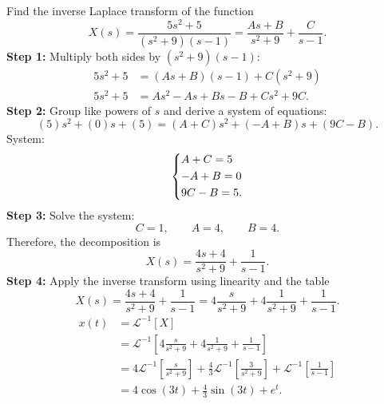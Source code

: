 \documentclass[10pt,letterpaper]{article}
\begin{document}
\begin{example}[5]{    
Find the inverse Laplace transform of the function
$$
X(s)=\frac{5s^2+5}{(s^2+9)(s-1)} =\frac{As+B}{s^2+9} + \frac{C}{s-1}.
$$
}
\textbf{Step 1:} Multiply both sides by $(s^2+9)(s-1)$:
\begin{align*}
5s^2+5&=(As+B)(s-1)+C(s^2+9)\\
5s^2+5&=As^2-As+Bs-B + Cs^2+9C.
\end{align*}
\textbf{Step 2:} Group like powers of $s$ and derive a system of equations:
\[
(5)s^2+(0)s+(5) = (A+C)s^2 +(-A+B)s +(9C-B).
\]
System:
$$
\begin{dcases}
A+C=5\\
-A+B=0\\
9C-B=5.
\end{dcases}
$$
\textbf{Step 3:} Solve the system:
\[
C=1, \qquad A=4, \qquad B=4.
\]
Therefore, the decomposition is
\[
X(s)=
\frac{4s+4}{s^2+9}
+\frac{1}{s-1}.
\]
\textbf{Step 4:} Apply the inverse transform using linearity and the table
\[
X(s)=
\frac{4s+4}{s^2+9}
+\frac{1}{s-1}=
4\frac{s}{s^2+9}
+
4\frac{1}{s^2+9}
+
\frac{1}{s-1}.
\]
\begin{align*}
x(t)&=\mathcal{L}^{-1}[X]\\
&=\mathcal{L}^{-1}\left[
4\frac{s}{s^2+9}
+
4\frac{1}{s^2+9}
+
\frac{1}{s-1}\right]\\
&=4\mathcal{L}^{-1}\left[\frac{s}{s^2+9}\right]
+
\frac{4}{3}\mathcal{L}^{-1}\left[\frac{3}{s^2+9}\right]
+
\mathcal{L}^{-1}\left[\frac{1}{s-1}\right]\\
&=4\cos(3t)
+\frac{4}{3}\sin(3t)
+e^{t}.
\end{align*}
\end{example}
\end{document}
